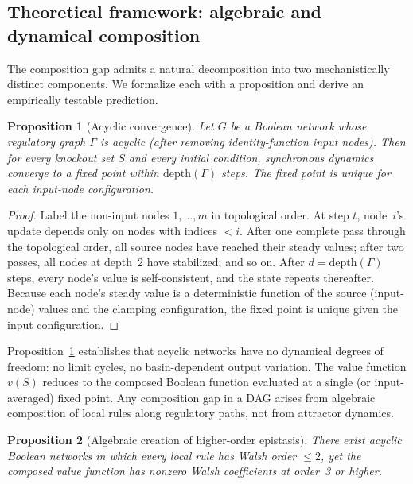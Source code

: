 \documentclass[10pt]{article}
\newtheorem{proposition}{Proposition}
\begin{document}
\subsection{Theoretical framework: algebraic and dynamical composition}
\label{sec:theory}

The composition gap admits a natural decomposition into two
mechanistically distinct components. We formalize each with a
proposition and derive an empirically testable prediction.

\begin{proposition}[Acyclic convergence]
\label{prop:dag}
Let $G$ be a Boolean network whose regulatory graph $\Gamma$ is
acyclic (after removing identity-function input nodes). Then for every
knockout set $S$ and every initial condition, synchronous dynamics
converge to a fixed point within $\mathrm{depth}(\Gamma)$ steps.
The fixed point is unique for each input-node configuration.
\end{proposition}

\begin{proof}
Label the non-input nodes $1, \ldots, m$ in topological order. At
step $t$, node~$i$'s update depends only on nodes with indices
$< i$. After one complete pass through the topological order, all
source nodes have reached their steady values; after two passes, all
nodes at depth~2 have stabilized; and so on. After
$d = \mathrm{depth}(\Gamma)$ steps, every node's value is
self-consistent, and the state repeats thereafter. Because each
node's steady value is a deterministic function of the source
(input-node) values and the clamping configuration, the fixed point
is unique given the input configuration.
\end{proof}

Proposition~\ref{prop:dag} establishes that acyclic networks have no
dynamical degrees of freedom: no limit cycles, no basin-dependent
output variation. The value function $v(S)$ reduces to the composed
Boolean function evaluated at a single (or input-averaged) fixed
point. Any composition gap in a DAG arises from algebraic composition
of local rules along regulatory paths, not from attractor dynamics.

\begin{proposition}[Algebraic creation of higher-order epistasis]
\label{prop:creation}
There exist acyclic Boolean networks in which every local rule has
Walsh order $\leq 2$, yet the composed value function has nonzero
Walsh coefficients at order~3 or higher.
\end{proposition}
\end{document}

